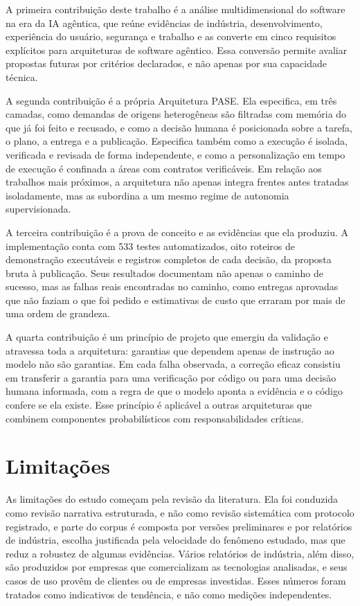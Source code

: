 A primeira contribuição deste trabalho é a análise multidimensional do software na era da IA agêntica, que reúne evidências de indústria, desenvolvimento, experiência do usuário, segurança e trabalho e as converte em cinco requisitos explícitos para arquiteturas de software agêntico. Essa conversão permite avaliar propostas futuras por critérios declarados, e não apenas por sua capacidade técnica.

A segunda contribuição é a própria Arquitetura PASE. Ela especifica, em três camadas, como demandas de origens heterogêneas são filtradas com memória do que já foi feito e recusado, e como a decisão humana é posicionada sobre a tarefa, o plano, a entrega e a publicação. Especifica também como a execução é isolada, verificada e revisada de forma independente, e como a personalização em tempo de execução é confinada a áreas com contratos verificáveis. Em relação aos trabalhos mais próximos, a arquitetura não apenas integra frentes antes tratadas isoladamente, mas as subordina a um mesmo regime de autonomia supervisionada.

A terceira contribuição é a prova de conceito e as evidências que ela produziu. A implementação conta com 533 testes automatizados, oito roteiros de demonstração executáveis e registros completos de cada decisão, da proposta bruta à publicação. Seus resultados documentam não apenas o caminho de sucesso, mas as falhas reais encontradas no caminho, como entregas aprovadas que não faziam o que foi pedido e estimativas de custo que erraram por mais de uma ordem de grandeza.

A quarta contribuição é um princípio de projeto que emergiu da validação e atravessa toda a arquitetura: garantias que dependem apenas de instrução ao modelo não são garantias. Em cada falha observada, a correção eficaz consistiu em transferir a garantia para uma verificação por código ou para uma decisão humana informada, com a regra de que o modelo aponta a evidência e o código confere se ela existe. Esse princípio é aplicável a outras arquiteturas que combinem componentes probabilísticos com responsabilidades críticas.

\section{Limitações}\label{sec:6.2}

As limitações do estudo começam pela revisão da literatura. Ela foi conduzida como revisão narrativa estruturada, e não como revisão sistemática com protocolo registrado, e parte do corpus é composta por versões preliminares e por relatórios de indústria, escolha justificada pela velocidade do fenômeno estudado, mas que reduz a robustez de algumas evidências. Vários relatórios de indústria, além disso, são produzidos por empresas que comercializam as tecnologias analisadas, e seus casos de uso provêm de clientes ou de empresas investidas. Esses números foram tratados como indicativos de tendência, e não como medições independentes.

